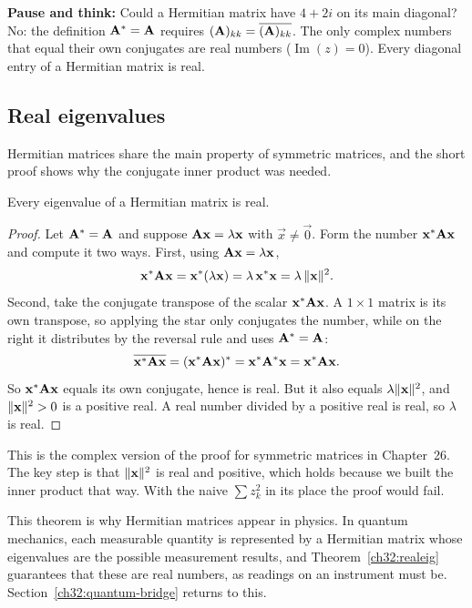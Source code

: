 \begin{recoverybox}
\textbf{Pause and think:} Could a Hermitian matrix have $4 + 2i$ on its main diagonal?
No: the definition $\mathbf{A}^* = \mathbf{A}$ requires $(\mathbf{A})_{kk} = \overline{(\mathbf{A})_{kk}}$.
The only complex numbers that equal their own conjugates are real numbers ($\operatorname{Im}(z) = 0$).
Every diagonal entry of a Hermitian matrix is real.
\end{recoverybox}

\subsection{Real eigenvalues}

Hermitian matrices share the main property of symmetric matrices, and the short
proof shows why the conjugate inner product was needed.

\begin{theorem}\label{ch32:realeig}
Every eigenvalue of a Hermitian matrix is real.
\end{theorem}

\begin{proof}
Let $\mathbf{A}^{*}=\mathbf{A}$ and suppose $\mathbf{A}\mathbf{x} = \lambda\mathbf{x}$ with
$\vec x\ne\vec 0$. Form the number $\mathbf{x}^{*}\mathbf{A}\mathbf{x}$ and compute it two
ways. First, using $\mathbf{A}\mathbf{x}=\lambda\mathbf{x}$,
\[
  \mathbf{x}^{*}\mathbf{A}\mathbf{x} = \mathbf{x}^{*}(\lambda\mathbf{x})
  = \lambda\,\mathbf{x}^{*}\mathbf{x} = \lambda\,\lVert\mathbf{x}\rVert^2.
\]
Second, take the conjugate transpose of the scalar $\mathbf{x}^{*}\mathbf{A}\mathbf{x}$. A
$1\times 1$ matrix is its own transpose, so applying the star only conjugates the
number, while on the right it distributes by the reversal rule and uses
$\mathbf{A}^{*}=\mathbf{A}$:
\[
  \overline{\mathbf{x}^{*}\mathbf{A}\mathbf{x}} = (\mathbf{x}^{*}\mathbf{A}\mathbf{x})^{*}
  = \mathbf{x}^{*}\mathbf{A}^{*}\mathbf{x} = \mathbf{x}^{*}\mathbf{A}\mathbf{x}.
\]
So $\mathbf{x}^{*}\mathbf{A}\mathbf{x}$ equals its own conjugate, hence is real. But it also
equals $\lambda\lVert\mathbf{x}\rVert^2$, and $\lVert\mathbf{x}\rVert^2>0$ is a positive real. A real
number divided by a positive real is real, so $\lambda$ is real.
\end{proof}

This is the complex version of the proof for symmetric matrices in Chapter~26.
The key step is that $\lVert\mathbf{x}\rVert^2$ is real and positive, which holds because
we built the inner product that way. With the naive $\sum z_k^2$ in its place the
proof would fail.

\begin{aestheticbox}
This theorem is why Hermitian matrices appear in physics. In quantum mechanics,
each measurable quantity is represented by a Hermitian matrix whose eigenvalues
are the possible measurement results, and Theorem~\ref{ch32:realeig} guarantees
that these are real numbers, as readings on an instrument must be.
Section~\ref{ch32:quantum-bridge} returns to this.
\end{aestheticbox}

